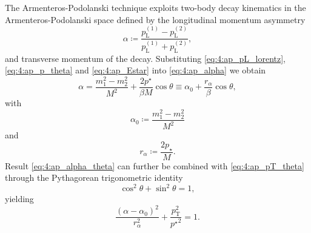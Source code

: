 The Armenteros-Podolanski technique exploits two-body decay kinematics in the Armenteros-Podolanski space defined by the longitudinal momentum asymmetry
\begin{equation}
	\alpha \coloneqq
	\frac
	{p_\text{L}^{(1)} - p_\text{L}^{(2)}}
	{p_\text{L}^{(1)} + p_\text{L}^{(2)}},
	\label{eq:4:ap_alpha}
\end{equation}
and transverse momentum \pt of the decay.
Substituting \eqref{eq:4:ap_pL_lorentz}, \eqref{eq:4:ap_p_theta} and \eqref{eq:4:ap_Estar} into \eqref{eq:4:ap_alpha} we obtain
\begin{equation}
\alpha =
\frac{m_1^2 - m_2^2}{M^2}
+
\frac{2p^\star}{\beta M} \cos\theta
\equiv
\alpha_0 + \frac{r_\alpha}{\beta} \cos\theta,
\label{eq:4:ap_alpha_theta}
\end{equation}
with
\begin{equation}
\alpha_0 \coloneqq \frac{m_1^2 - m_2^2}{M^2}
\end{equation}
and
\begin{equation}
r_\alpha \coloneqq \frac{2p_\star}{M}.
\end{equation}
Result \eqref{eq:4:ap_alpha_theta} can further be combined with \eqref{eq:4:ap_pT_theta} through the Pythagorean trigonometric identity
\begin{equation}
\cos^2 \theta + \sin^2 \theta = 1,
\end{equation}
yielding
\begin{equation}
\frac
{\left( \alpha - \alpha_0 \right)^2}
{r_\alpha^2}
+
\frac{p_\text{T}^2}{{p^\star}^2}
= 1.
\label{eq:4:ap_ellipse}
\end{equation}

